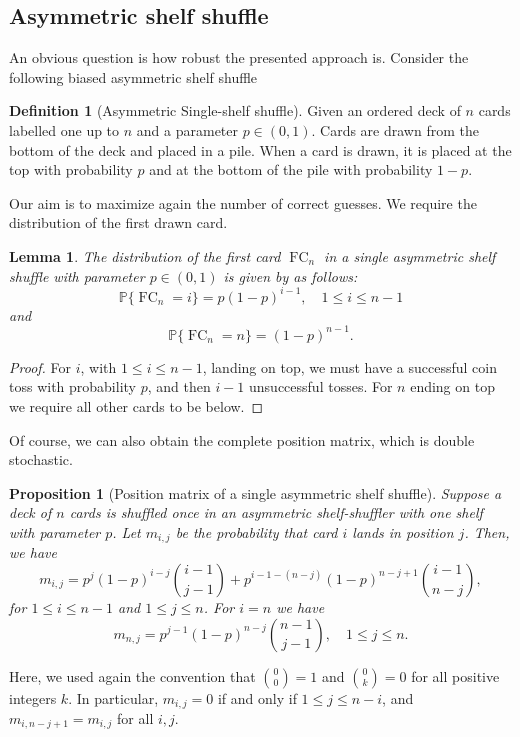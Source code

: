 \documentclass[10pt,reqno,a4paper]{amsart}
\newtheorem{lem}[theorem]{Lemma}
\newtheorem{prop}{Proposition}
\theoremstyle{definition}
\newtheorem{defi}{Definition}
\def\P{{\mathbb {P}}}
\DeclareMathOperator{\fc}{FC}
\begin{document}
\subsection{Asymmetric shelf shuffle}
An obvious question is how robust the presented approach is. Consider the following biased asymmetric shelf shuffle
\begin{defi}[Asymmetric Single-shelf shuffle]
Given an ordered deck of $n$ cards labelled one up to $n$ and a parameter $p\in(0,1)$. Cards are drawn from the bottom of the deck and placed in a pile. 
When a card is drawn, it is placed at the top with probability $p$ and at the bottom of the pile with probability $1-p$.
\end{defi}
Our aim is to maximize again the number of correct guesses. We require the distribution of the first drawn card.
\begin{lem}
The distribution of the first card $\fc_n$ in a single asymmetric shelf shuffle with parameter $p\in(0,1)$ is given by as follows:
\begin{equation}
\label{eq:fc2}
\P\{\fc_n=i\}=p(1-p)^{i-1},\quad 1\le i \le n-1
\end{equation}
and 
\[
\P\{\fc_n=n\}=(1-p)^{n-1}.
\]
\end{lem}
\begin{proof}
For $i$, with $1\le i \le n-1$, landing on top, we must have a successful coin toss with probability $p$, and then $i-1$ unsuccessful tosses.
For $n$ ending on top we require all other cards to be below.
\end{proof}
Of course, we can also obtain the complete position matrix, which is double stochastic.
\begin{prop}[Position matrix of a single asymmetric shelf shuffle]
\label{prop:posi}
Suppose a deck of $n$ cards is shuffled once in an asymmetric shelf-shuffler with one shelf with parameter $p$.
Let $m_{i,j}$ be the probability that card $i$ lands in position $j$.
Then, we have
\[
m_{i,j}
=
p^{j}(1-p)^{i-j}\binom{i-1}{j-1} + p^{i-1-(n-j)}(1-p)^{n-j+1}\binom{i-1}{n-j},
\]
for $1 \le i \le n-1$ and $1 \le j \le n$. For $i=n$ we have 
\[
m_{n,j}= p^{j-1}(1-p)^{n-j}\binom{n-1}{j-1},\quad 1\le j\le n.
\]
\end{prop}
Here, we used again the convention that $\binom{0}{0} = 1$ and $\binom{0}{k} = 0$
for all positive integers $k$. In particular, $m_{i,j} = 0$ if and only if $1 \le j \le n-i$,
and $m_{i,n-j+1} = m_{i,j}$ for all $i,j$.
\end{document}
